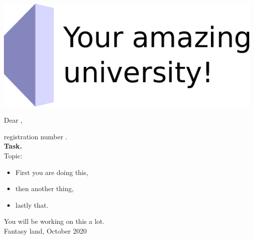 \begin{center}
\makeatletter
\includegraphics[height=9ex]{./images/logos/university_logo.pdf}

\vspace{1\baselineskip}

Dear \@author,

registration number \@immnumber.\\[0.5\baselineskip]

\textbf{\@thesis{} Task.}\\[0.5\baselineskip]

Topic:

\begin{english}
	\bfseries\@title
\end{english}
\makeatother
\end{center}
{%
\kant[1-2]
\begin{itemize}
	\item First you are doing this,
	\item then another thing,
	\item lastly that.
\end{itemize}
}%
\vspace{\baselineskip}

\noindent You will be working on this a lot.\\[0.4\baselineskip]

\noindent Fantasy land, October 2020\\[2\baselineskip]